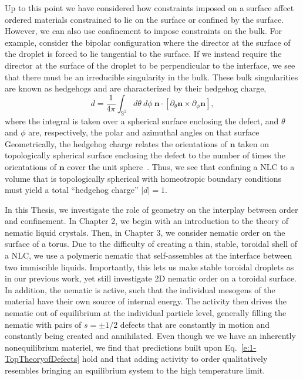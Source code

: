 Up to this point we have considered how constraints imposed on a surface affect ordered materials constrained to lie on the surface or confined by the surface.
However, we can also use confinement to impose constraints on the bulk.
For example, consider the bipolar configuration where the director at the surface of the droplet is forced to lie tangential to the surface.
If we instead require the director at the surface of the droplet to be perpendicular to the interface, we see that there must be an irreducible singularity in the bulk.
These bulk singularities are known as hedgehogs and are characterized by their hedgehog charge,
\begin{equation}
  d = \frac{1}{4 \pi} \int_{\mathbb{S}^2} d\theta \: d\phi \: \mathbf{n} \cdot \left [ \partial_{\theta} \mathbf{n} \times \partial_{\phi} \mathbf{n} \right ],\label{e:1-HedgehogCharge}
\end{equation}
where the integral is taken over a spherical surface enclosing the defect, and $\theta$ and $\phi$ are, respectively, the polar and azimuthal angles on that surface~\cite{RN153}
Geometrically, the hedgehog charge relates the orientations of $\mathbf{n}$ taken on topologically spherical surface enclosing the defect to the number of times the orientations of $\mathbf{n}$ cover the unit sphere~\cite{RN153}.
Thus, we see that confining a NLC to a volume that is topologically spherical with homeotropic boundary conditions must yield a total ``hedgehog charge'' $|d|=1$.

In this Thesis, we investigate the role of geometry on the interplay between order and confinement.
In Chapter 2, we begin with an introduction to the theory of nematic liquid crystals.
Then, in Chapter 3, we consider nematic order on the surface of a torus.
Due to the difficulty of creating a thin, stable, toroidal shell of a NLC, we use a polymeric nematic that self-assembles at the interface between two immiscible liquids.
Importantly, this lets us make stable toroidal droplets as in our previous work, yet still investigate 2D nematic order on a toroidal surface.
In addition, the nematic is active, such that the individual mesogens of the material have their own source of internal energy.
The activity then drives the nematic out of equilibrium at the individual particle level, generally filling the nematic with pairs of $s = \pm 1/2$ defects that are constantly in motion and constantly being created and annihilated.
Even though we we have an inherently nonequilibrium materiel, we find that predictions built upon Eq.~\ref{e:1-TopTheoryofDefects} hold and that adding activity to order qualitatively resembles bringing an equilibrium system to the high temperature limit.

